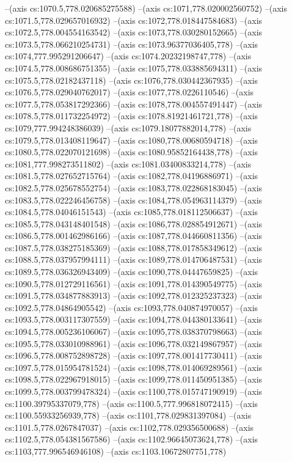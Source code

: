 --(axis cs:1070.5,778.020685275588)
--(axis cs:1071,778.020002560752)
--(axis cs:1071.5,778.029657016932)
--(axis cs:1072,778.018447584683)
--(axis cs:1072.5,778.004554163542)
--(axis cs:1073,778.030280152665)
--(axis cs:1073.5,778.066210254731)
--(axis cs:1073.96377036405,778)
--(axis cs:1074,777.995291206647)
--(axis cs:1074.20232198747,778)
--(axis cs:1074.5,778.008686751355)
--(axis cs:1075,778.033885694311)
--(axis cs:1075.5,778.02182437118)
--(axis cs:1076,778.030442367935)
--(axis cs:1076.5,778.029040762017)
--(axis cs:1077,778.0226110546)
--(axis cs:1077.5,778.053817292366)
--(axis cs:1078,778.004557491447)
--(axis cs:1078.5,778.011732254972)
--(axis cs:1078.81921461721,778)
--(axis cs:1079,777.994248386039)
--(axis cs:1079.18077882014,778)
--(axis cs:1079.5,778.013408119647)
--(axis cs:1080,778.00680594718)
--(axis cs:1080.5,778.022070121698)
--(axis cs:1080.95852164438,778)
--(axis cs:1081,777.998273511802)
--(axis cs:1081.03400833214,778)
--(axis cs:1081.5,778.027652715764)
--(axis cs:1082,778.04196886971)
--(axis cs:1082.5,778.025678552754)
--(axis cs:1083,778.022868183045)
--(axis cs:1083.5,778.022246456758)
--(axis cs:1084,778.054963114379)
--(axis cs:1084.5,778.04046151543)
--(axis cs:1085,778.018112506637)
--(axis cs:1085.5,778.043148401548)
--(axis cs:1086,778.028854912671)
--(axis cs:1086.5,778.001462986166)
--(axis cs:1087,778.044660811356)
--(axis cs:1087.5,778.038275185369)
--(axis cs:1088,778.017858349612)
--(axis cs:1088.5,778.037957994111)
--(axis cs:1089,778.014706487531)
--(axis cs:1089.5,778.036326943409)
--(axis cs:1090,778.04447659825)
--(axis cs:1090.5,778.012729116561)
--(axis cs:1091,778.014390549775)
--(axis cs:1091.5,778.034877883913)
--(axis cs:1092,778.012325237323)
--(axis cs:1092.5,778.04864905542)
--(axis cs:1093,778.040874970057)
--(axis cs:1093.5,778.003117307559)
--(axis cs:1094,778.044380133641)
--(axis cs:1094.5,778.005236106067)
--(axis cs:1095,778.038370798663)
--(axis cs:1095.5,778.033010988961)
--(axis cs:1096,778.032149867957)
--(axis cs:1096.5,778.008752898728)
--(axis cs:1097,778.001417730411)
--(axis cs:1097.5,778.015954781524)
--(axis cs:1098,778.014069289561)
--(axis cs:1098.5,778.022967918015)
--(axis cs:1099,778.011450951385)
--(axis cs:1099.5,778.003799478324)
--(axis cs:1100,778.015747190919)
--(axis cs:1100.39795337079,778)
--(axis cs:1100.5,777.996818072415)
--(axis cs:1100.55933256939,778)
--(axis cs:1101,778.029831397084)
--(axis cs:1101.5,778.0267847037)
--(axis cs:1102,778.029356500688)
--(axis cs:1102.5,778.054381567586)
--(axis cs:1102.96645073624,778)
--(axis cs:1103,777.996546946108)
--(axis cs:1103.10672807751,778)
